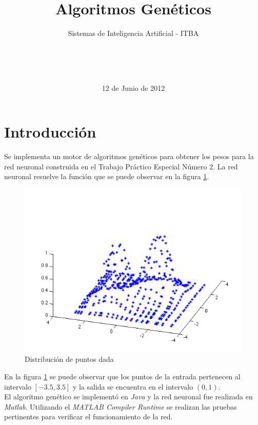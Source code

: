 \documentclass{sig-alternate}
\begin{document}

\title{Algoritmos Genéticos}
\subtitle{Sistemas de Inteligencia Artificial - ITBA}


\author{
	\\
	\\
	\\	
}

\date{12 de Junio de 2012}

\maketitle

\section{Introducción}

	Se implementa un motor de algoritmos genéticos para obtener los pesos para la red neuronal construida en el Trabajo Práctico Especial Número 2.
	La red neuronal resuelve la función que se puede observar en la figura \ref{fig:function}.

	\begin{figure}[!ht]
		\includegraphics[scale=0.5]{./figures/function.png}
  		\caption{Distribución de puntos dada}
  		\label{fig:function}
	\end{figure}

	En la figura \ref{fig:function} se puede observar que los puntos de la entrada pertenecen al intervalo $[-3.5, 3.5]$ y la salida se encuentra en el intervalo $(0, 1)$.\\
	El algoritmo genético se implementó en \textit{Java} y la red neuronal fue realizada en \textit{Matlab}. Utilizando el \textit{MATLAB Compiler Runtime} se realizan las pruebas pertinentes para verificar el funcionamiento de la red.\\
\end{document}
